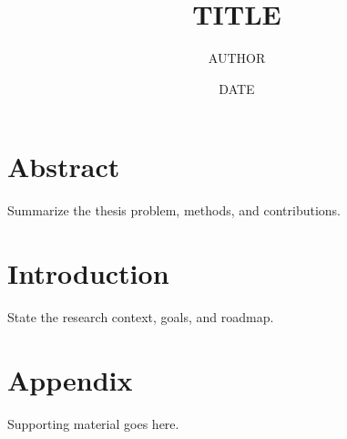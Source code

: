 \documentclass[12pt,oneside]{book}
\title{{{TITLE}}}
\author{{{AUTHOR}}}
\date{{{DATE}}}
\theoremstyle{definition}
\begin{document}
\frontmatter
\maketitle
\tableofcontents

\chapter*{Abstract}
Summarize the thesis problem, methods, and contributions.

\mainmatter

\chapter{Introduction}
\label{chap:introduction}

State the research context, goals, and roadmap.


\appendix
\chapter{Appendix}
Supporting material goes here.

\end{document}

